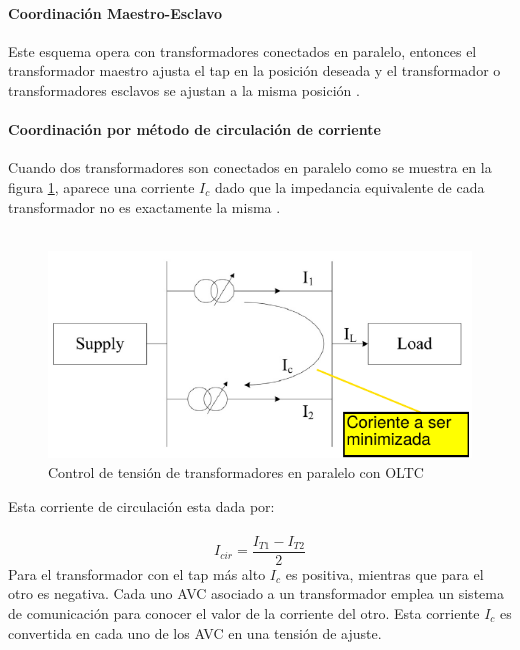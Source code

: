 \documentclass[12pt, letterpaper]{report}
\begin{document}
\paragraph{Coordinación Maestro-Esclavo}
Este esquema opera con transformadores conectados en paralelo,  entonces el transformador maestro ajusta el tap en la posición deseada  y el transformador o transformadores esclavos se ajustan a la misma posición \cite{Fila2007}\cite{Sarimuthu2016}. 
\paragraph{Coordinación por método de circulación de corriente} 
Cuando dos transformadores son conectados en paralelo como se muestra en la figura \ref{fig:paralelo}, aparece una  corriente $I_{c}$ dado que la impedancia equivalente de cada transformador no es exactamente la misma \cite{Fila2007}.\\\\
\begin{figure}[h]
\centering
\caption{Control de tensión de transformadores en paralelo con OLTC}
\label{fig:paralelo}
\includegraphics[width=0.7\linewidth]{imagenes/cap_2/paralelo}
\end{figure}
Esta corriente  de circulación esta dada por:\\\\
\begin{equation}
  \label{eq:icir}
I_{cir} = \dfrac{I_{T1} - I_{T2}}{2} 
\end{equation}
Para el transformador con el tap más alto $I_{c}$ es positiva, mientras que para el  otro es negativa. Cada uno AVC asociado a un transformador emplea un sistema de comunicación para conocer el valor de la corriente del otro. Esta corriente $I_{c}$ es convertida en cada uno de los AVC en una tensión de ajuste.
\end{document}
